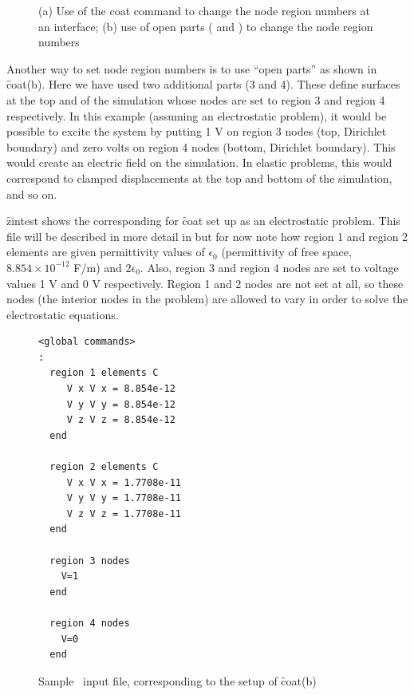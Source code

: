 \documentclass[a4paper,twoside,11pt]{book}
\begin{document}
\begin{figure}
  \caption{(a) Use of the coat command to change the node region
    numbers at an interface; (b) use of open parts ( and
    ) to change the node region numbers}
  \label{coat}
\end{figure}

Another way to set node region numbers is to use ``open parts'' as shown
in \f{coat}(b). Here we have used two additional parts (3 and 4). These
define surfaces at the top and of the simulation whose nodes are set
to region 3 and region 4 respectively. In this example (assuming an
electrostatic problem), it would be possible to excite the system by
putting 1 V on region 3 nodes (top, Dirichlet boundary) and zero volts
on region 4 nodes (bottom, Dirichlet boundary). This would create an
electric field on the simulation. In elastic problems, this would
correspond to clamped displacements at the top and bottom of the
simulation, and so on.

\f{zintest} shows the corresponding  for \f{coat} set up as an
electrostatic problem. This file will be described in more detail in
 but for now note how region 1 and region 2 elements are given
permittivity values of $\epsilon_0$ (permittivity of free space,
$8.854\times10^{-12}$ F/m) and $2\epsilon_0$. Also, region 3 and
region 4 nodes are set to voltage values 1 V and 0 V
respectively. Region 1 and 2 nodes are not set at all, so these nodes
(the interior nodes in the problem) are allowed to vary in order to
solve the electrostatic equations.

\begin{figure}
\begin{verbatim}
<global commands>
:
  region 1 elements C
     V x V x = 8.854e-12
     V y V y = 8.854e-12
     V z V z = 8.854e-12
  end

  region 2 elements C
     V x V x = 1.7708e-11
     V y V y = 1.7708e-11
     V z V z = 1.7708e-11
  end

  region 3 nodes
    V=1
  end

  region 4 nodes
    V=0
  end
\end{verbatim}
\caption{Sample \zinc\ input file,  corresponding to the
  setup of \f{coat}(b)}
\label{zintest}
\end{figure}
\end{document}
